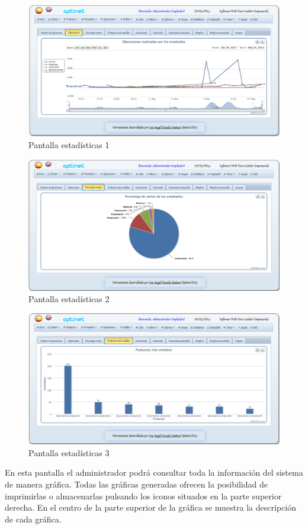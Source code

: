 \documentclass[a4paper,11pt]{book}
\begin{document}
\begin{figure}[!htb]
  \centering
    \includegraphics[scale=0.35]{capestadisticas1.png}
  \caption{Pantalla estadísticas 1}
  \label{a}
\end{figure}

\newpage
\begin{figure}[!htb]
  \centering
    \includegraphics[scale=0.35]{capestadisticas2.png}
  \caption{Pantalla estadísticas 2}
  \label{a}
\end{figure}

\begin{figure}[!htb]
  \centering
    \includegraphics[scale=0.35]{capestadisticas3.png}
  \caption{Pantalla estadísticas 3}
  \label{a}
\end{figure}
En esta pantalla el administrador podrá consultar toda la información del sistema de manera gráfica. Todas las gráficas generadas ofrecen la posibilidad de imprimirlas o almacenarlas pulsando los iconos situados en la parte superior derecha. En el centro de la parte superior de la gráfica se muestra la descripción de cada gráfica.
\end{document}
